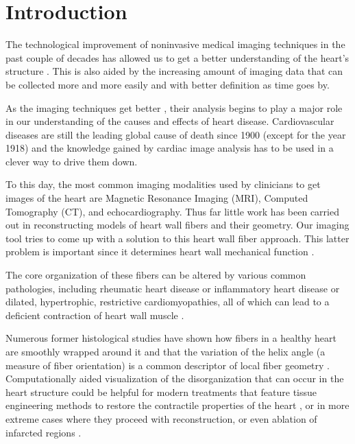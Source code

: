 \chapter{Introduction}

The technological improvement of noninvasive medical imaging techniques in the past couple of decades has allowed us to get a better understanding of the heart's structure \cite{sinusas2008multimodality}. This is also aided by the increasing amount of imaging data that can be collected more and more easily and with better definition as time goes by.

As the imaging techniques get better \cite{shaw2010cardiovascular}, their analysis begins to play a major role in our understanding of the causes and effects of heart disease. Cardiovascular diseases are still the leading global cause of death \cite{mozaffarian2015heart} since 1900 (except for the year 1918) and the knowledge gained by cardiac image analysis has to be used in a clever way to drive them down.

To this day, the most common imaging modalities used by clinicians to get images of the heart are Magnetic Resonance Imaging (MRI), Computed Tomography (CT), and echocardiography. Thus far little work has been carried out in reconstructing models of heart wall fibers and their geometry. Our imaging tool tries to come up with a solution to this heart wall fiber approach. This latter problem is important since it determines heart wall mechanical function \cite{hooks2002cardiac}.

The core organization of these fibers can be altered by various common pathologies, including rheumatic heart disease or inflammatory heart disease or dilated, hypertrophic, restrictive cardiomyopathies, all of which can lead to a deficient contraction of heart wall muscle \cite{kerwin2000ventricular, beg2004computational}.

Numerous former histological studies have shown how fibers in a healthy heart are smoothly wrapped around it and that the variation of the helix angle (a measure of fiber orientation) is a common descriptor of local fiber geometry \cite{geerts2002characterization}. Computationally aided visualization of the disorganization that can occur in the heart structure could be helpful for modern treatments that feature tissue engineering methods to restore the contractile properties of the heart \cite{caplan2006mesenchymal,laflamme2007cardiomyocytes,laflamme2005regenerating, song2012heart, zimmermann2004engineered}, or in more extreme cases where they proceed with reconstruction, or even ablation of infarcted regions \cite{athanasuleas2004surgical, di2001effects, jones2009coronary, sartipy2005dor}.

